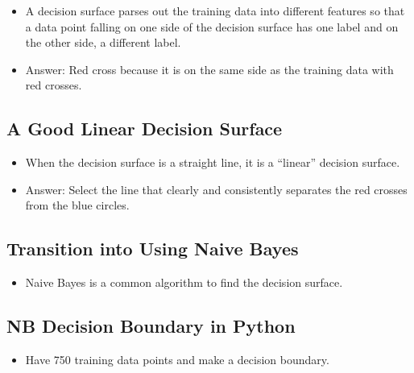 \documentclass[12pt]{report}
\begin{document}
\begin{itemize}

\item A decision surface parses out the training data into different features so that a data point falling on one side of the decision surface has one label and on the other side, a different label. 

\item Answer: Red cross because it is on the same side as the training data with red crosses. 

\end{itemize}

\subsection{A Good Linear Decision Surface}

\begin{itemize}

\item When the decision surface is a straight line, it is a ``linear'' decision surface.

\item Answer: Select the line that clearly and consistently separates the red crosses from the blue circles.  

\end{itemize}

\subsection{Transition into Using Naive Bayes}

\begin{itemize}

\item Naive Bayes is a common algorithm to find the decision surface. 

\end{itemize}

\subsection{NB Decision Boundary in Python}

\begin{itemize}

\item Have 750 training data points and make a decision boundary. 

\end{itemize}
\end{document}
